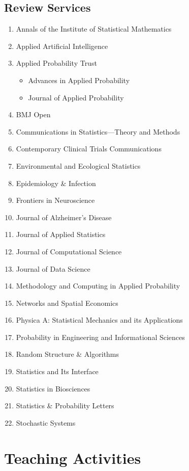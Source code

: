 \documentclass[12pt]{article}
\begin{document}
	\subsection*{Review Services}
	\begin{enumerate}
		\item Annals of the Institute of Statistical Mathematics
		\item Applied Artificial Intelligence
		\item Applied Probability Trust
		\begin{itemize}
			\item Advances in Applied Probability 
			\item Journal of Applied Probability
		\end{itemize}
		\item BMJ Open
		\item Communications in Statistics---Theory and Methods
		\item Contemporary Clinical Trials Communications
		\item Environmental and Ecological Statistics
		\item Epidemiology \& Infection
		\item Frontiers in Neuroscience
		\item Journal of Alzheimer's Disease
		\item Journal of Applied Statistics
		\item Journal of Computational Science 
		\item Journal of Data Science
		\item Methodology and Computing in Applied Probability
		\item Networks and Spatial Economics
		\item Physica A: Statistical Mechanics and its Applications
		\item Probability in Engineering and Informational Sciences
		\item Random Structure \& Algorithms
		\item Statistics and Its Interface
		\item Statistics in Biosciences
		\item Statistics \& Probability Letters
		\item Stochastic Systems
	\end{enumerate}
	
	\section*{Teaching Activities}
\end{document}
